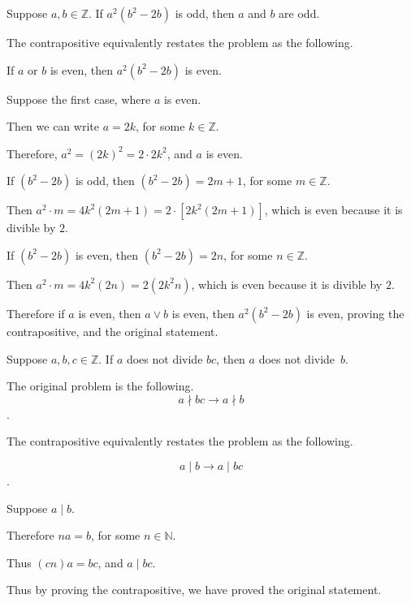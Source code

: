 \documentclass[openany, 12pt]{book}
\begin{document}
\begin{exercise}{}{}
	Suppose $a,b \in \mathbb{Z}$. If $a^2 (b^2 - 2b)$ is odd, then $a$ and $b$ are odd.
	\begin{alist}
		\item The contrapositive equivalently restates the problem as the following.
		\item If $a$ or $b$ is even, then $a^2 (b^2 - 2b)$ is even.
		\item Suppose the first case, where $a$ is even.
		\item Then we can write $a = 2k$, for some $k \in \mathbb{Z}$.
		\item Therefore, $a^2 = (2k)^2 = 2 \cdot 2k^2$, and $a$ is even.
		\item If $(b^2 - 2b)$ is odd, then $(b^2 - 2b) = 2m+1$, for some $m \in \mathbb{Z}$.
		\item Then $a^2 \cdot m = 4k^2(2m+1)= 2 \cdot [2k^2(2m+1)]$, which is even because it is
		divible by $2$.
		\item If $(b^2 - 2b)$ is even, then $(b^2 - 2b) = 2n$, for some $n \in \mathbb{Z}$.
		\item Then $a^2 \cdot m = 4k^2(2n)= 2 (2k^2n)$, which is even because it is
		divible by $2$.
		\item Therefore if $a$ is even, then $a \vee b$ is even, then $a^2 (b^2 - 2b)$ is even, proving the
		contrapositive, and the original statement.
	\end{alist}
\end{exercise}

\begin{exercise}{}{}
	Suppose $a,b,c  \in \mathbb{Z}$. If $a$ does not divide $bc$,
	then $a$ does not \mbox{divide $b$}.
	\begin{alist}
		\item The original problem is the following. $$a \nmid bc \rightarrow a \nmid b$$.
		\item The contrapositive equivalently restates the problem as the following.
		\item $$a \mid b \rightarrow a \mid bc$$.
		\item Suppose $a \mid b$.
		\item Therefore $na = b$, for some $n \in \mathbb{N}$.
		\item Thus $(cn)a = bc$, and $ a \mid bc $.
		\item Thus by proving the contrapositive, we have proved the original
		statement.
	\end{alist}
\end{exercise}
\end{document}
